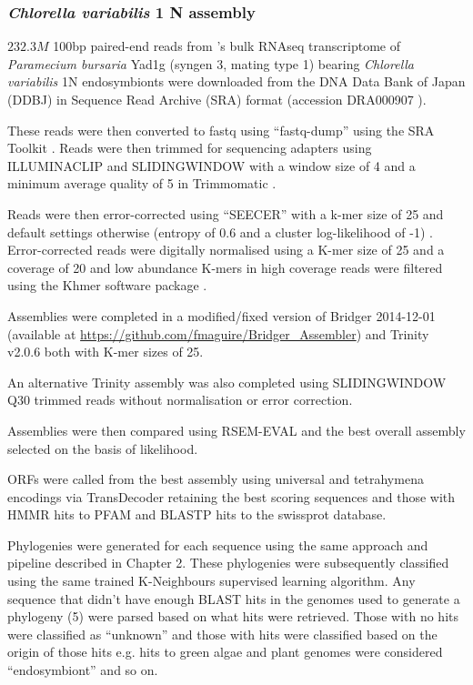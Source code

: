 \subsubsection{\textit{Chlorella variabilis} 1 N assembly}
\(232.3M\) 100bp paired-end reads from \citep{Kodama2014}'s 
bulk RNAseq transcriptome of \textit{Paramecium bursaria} Yad1g (syngen
3, mating type 1) bearing \textit{Chlorella variabilis} 1N endosymbionts
were downloaded from the DNA Data Bank of Japan (DDBJ) \citep{Tateno2002,Kaminuma2011}
in Sequence Read Archive (SRA) format \citep{Leinonen2011,KodamaNRA2012b} (accession DRA000907 \citep{Kodama2014}).

These reads were then converted to fastq using ``fastq-dump'' using the SRA Toolkit
\citep{NationalCenterforBiotechnologyInformation2011}.  Reads were then trimmed
for sequencing adapters using ILLUMINACLIP and SLIDINGWINDOW with a window size
of 4 and a minimum average quality of 5 in Trimmomatic \citep{Bolger2014a}.

Reads were then error-corrected using ``SEECER'' with a k-mer size of 25 and 
default settings otherwise (entropy of 0.6 and a cluster log-likelihood
of -1) \citep{Le2013}.  Error-corrected reads were digitally normalised
using a K-mer size of 25 and a coverage of 20 \citep{Brown2012} and 
low abundance K-mers in high coverage reads were filtered \citep{Zhang2014,Zhang2015}
using the Khmer software package \citep{Doring2008,Crusoe2015}.

Assemblies were completed in a modified/fixed version of 
Bridger 2014-12-01 \citep{Chang2015} (available at
\url{https://github.com/fmaguire/Bridger_Assembler}) and 
Trinity v2.0.6 \citep{Grabherr2011,Haas2013} both with K-mer
sizes of 25.

An alternative Trinity assembly was also completed using
SLIDINGWINDOW Q30 trimmed reads without normalisation or 
error correction.

Assemblies were then compared using RSEM-EVAL \citep{Li2014} and the best
overall assembly selected on the basis of likelihood.

ORFs were called from the best assembly using universal and tetrahymena encodings 
via TransDecoder \citep{Haas2013} retaining the best scoring sequences and those
with HMMR hits to PFAM and BLASTP hits to the swissprot database. 

Phylogenies were generated for each sequence using the same approach and pipeline
described in Chapter 2. These phylogenies were subsequently classified using the 
same trained K-Neighbours supervised learning algorithm.
Any sequence that didn't have enough BLAST hits in the genomes used to generate
a phylogeny (5) were parsed based on what hits were retrieved.
Those with no hits were classified as ``unknown'' and those with
hits were classified based on the origin of those hits e.g. hits
to green algae and plant genomes were considered ``endosymbiont'' and so on.

